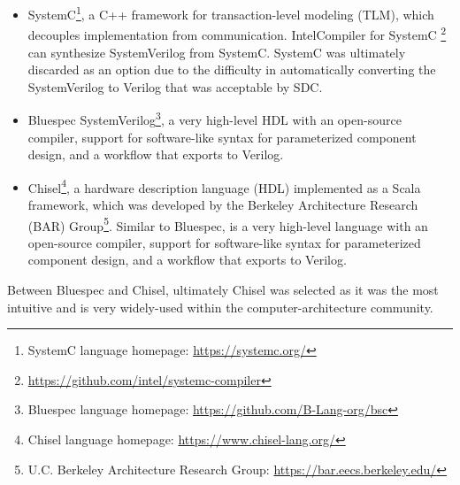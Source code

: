 \begin{itemize}
    \item SystemC\cite{systemc}\footnote{SystemC language homepage: \url{https://systemc.org/}}, a C++ framework for transaction-level modeling (TLM)\cite{systemc}, which decouples implementation from communication. Intel\textregistered Compiler for SystemC \footnote{\url{https://github.com/intel/systemc-compiler}} can synthesize SystemVerilog from SystemC. SystemC was ultimately discarded as an option due to the difficulty in automatically converting the SystemVerilog to Verilog that was acceptable by SDC.
    \item Bluespec SystemVerilog\cite{bluespec}\footnote{Bluespec language homepage: \url{https://github.com/B-Lang-org/bsc}}, a very high-level HDL with an open-source compiler, support for software-like syntax for parameterized component design, and a workflow that exports to Verilog.
    \item Chisel\cite{chisel}\footnote{Chisel language homepage: \url{https://www.chisel-lang.org/}}, a hardware description language (HDL) implemented as a Scala framework, which was developed by the Berkeley Architecture Research (BAR) Group\footnote{U.C. Berkeley Architecture Research Group: \url{https://bar.eecs.berkeley.edu/}}. Similar to Bluespec, is a very high-level language with an open-source compiler, support for software-like syntax for parameterized component design, and a workflow that exports to Verilog.
\end{itemize}

Between Bluespec and Chisel, ultimately Chisel was selected as it was the most intuitive and is very widely-used within the computer-architecture community.